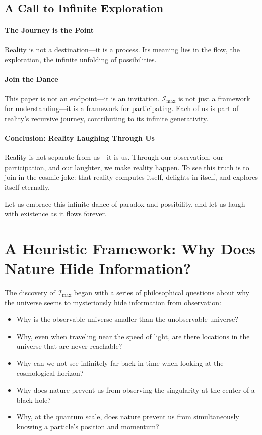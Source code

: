 \documentclass[12pt]{article}
\begin{document}
\subsection{A Call to Infinite Exploration}

\paragraph{The Journey is the Point}
Reality is not a destination—it is a process. Its meaning lies in the flow, the exploration, the infinite unfolding of possibilities.

\paragraph{Join the Dance}
This paper is not an endpoint—it is an invitation. \(\mathcal{I}_{\text{max}}\) is not just a framework for understanding—it is a framework for participating. Each of us is part of reality’s recursive journey, contributing to its infinite generativity.

\paragraph{Conclusion: Reality Laughing Through Us}
Reality is not separate from us—it is us. Through our observation, our participation, and our laughter, we make reality happen. To see this truth is to join in the cosmic joke: that reality computes itself, delights in itself, and explores itself eternally.

Let us embrace this infinite dance of paradox and possibility, and let us laugh with existence as it flows forever.


\appendix

\section{A Heuristic Framework: Why Does Nature Hide Information?}

The discovery of $\mathcal{I}_{\text{max}}$ began with a series of philosophical questions about why the universe seems to mysteriously hide information from observation:
\begin{itemize}
    \item Why is the observable universe smaller than the unobservable universe?
    \item Why, even when traveling near the speed of light, are there locations in the universe that are never reachable?
    \item Why can we not see infinitely far back in time when looking at the cosmological horizon?
    \item Why does nature prevent us from observing the singularity at the center of a black hole?
    \item Why, at the quantum scale, does nature prevent us from simultaneously knowing a particle's position and momentum?
\end{itemize}
\end{document}
